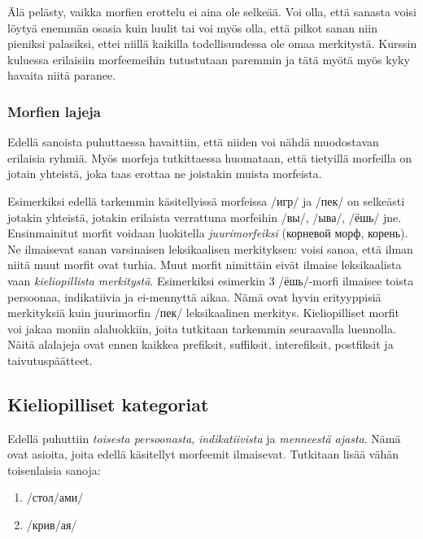 Älä pelästy, vaikka morfien erottelu ei aina ole selkeää. Voi olla, että
sanasta voisi löytyä enemmän osasia kuin luulit tai voi myös olla, että
pilkot sanan niin pieniksi palasiksi, ettei niillä kaikilla
todellisuudessa ole omaa merkitystä. Kurssin kuluessa erilaisiin
morfeemeihin tutustutaan paremmin ja tätä myötä myös kyky havaita niitä
paranee.

\subsubsection{Morfien lajeja}\label{morfien-lajeja}

Edellä sanoista puhuttaessa havaittiin, että niiden voi nähdä
muodostavan erilaisia ryhmiä. Myös morfeja tutkittaessa huomataan, että
tietyillä morfeilla on jotain yhteistä, joka taas erottaa ne joistakin
muista morfeista.

Esimerkiksi edellä tarkemmin käsitellyissä morfeissa /игр/ ja /пек/ on
selkeästi jotakin yhteistä, jotakin erilaista verrattuna morfeihin /вы/,
/ыва/, /ёшь/ jne. Ensinmainitut morfit voidaan luokitella
\emph{juurimorfeiksi} (корневой морф, корень). Ne ilmaisevat sanan
varsinaisen leksikaalisen merkityksen: voisi sanoa, että ilman niitä
muut morfit ovat turhia. Muut morfit nimittäin eivät ilmaise
leksikaalista vaan \emph{kieliopillista merkitystä}. Esimerkiksi
esimerkin 3 /ёшь/-morfi ilmaisee toista persoonaa, indikatiivia ja
ei-mennyttä aikaa. Nämä ovat hyvin erityyppisiä merkityksiä kuin
juurimorfin /пек/ leksikaalinen merkitys. Kieliopilliset morfit voi
jakaa moniin alaluokkiin, joita tutkitaan tarkemmin seuraavalla
luennolla. Näitä alalajeja ovat ennen kaikkea prefiksit, suffiksit,
interefiksit, postfiksit ja taivutuspäätteet.

\subsection{Kieliopilliset kategoriat}\label{kieliopilliset-kategoriat}

Edellä puhuttiin \emph{toisesta persoonasta}, \emph{indikatiivista} ja
\emph{menneestä ajasta}. Nämä ovat asioita, joita edellä käsitellyt
morfeemit ilmaisevat. Tutkitaan lisää vähän toisenlaisia sanoja:

\begin{enumerate}
\def\labelenumi{(\arabic{enumi})}
\setcounter{enumi}{3}
\itemsep1pt\parskip0pt
\item
  /стол/ами/
\item
  /крив/ая/
\end{enumerate}

